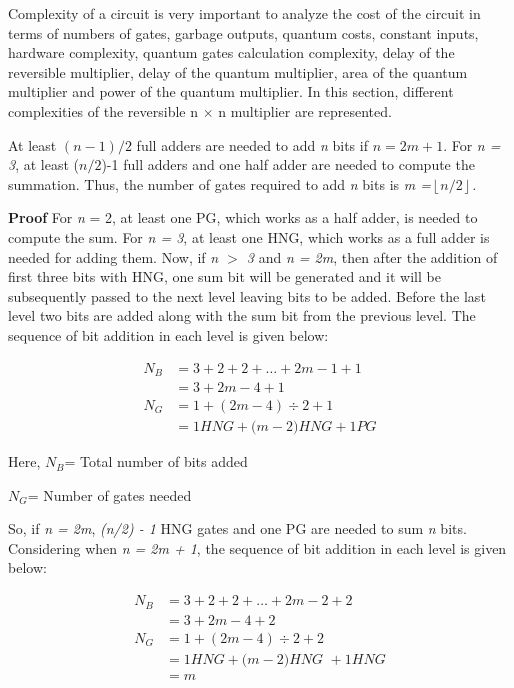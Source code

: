 Complexity of a circuit is very important to analyze the cost of the circuit in terms of numbers of gates, garbage outputs, quantum costs, constant inputs, hardware complexity, quantum gates calculation complexity, delay of the reversible multiplier, delay of the quantum multiplier, area of the quantum multiplier and power of the quantum multiplier. In this section, different complexities of the reversible {n $\times$ n} multiplier are represented.
\begin{property}\label{p1_c3_p1}\textnormal{
	At least $(n-1)/2$ full adders are needed to add \textit{n} bits if $n=2m+1$. For \textit{n = 3}, at least ($n/2$)-1 full adders and one half adder are needed to compute the summation. Thus, the number of gates required to add \textit{n }bits is \textit{m =$\left\lfloor n/2\right\rfloor $.}}
\end{property}
\noindent\textbf{Proof}
	For \textit{n} = 2, at least one PG, which works as a half adder, is needed to compute the sum. For \textit{n = 3}, at least one HNG, which works as a full adder is needed for adding them. Now, if  \textit{n $>$ 3} and \textit{n = 2m}, then after the addition of first three bits with HNG, one sum bit will be generated and it will be subsequently passed to the next level leaving  bits to be added. Before the last level two bits are added along with the sum bit from the previous level. The sequence of bit addition in each level is given below:


\begin{align*}
N_{B} &= 3+2+2+{\dots}+2m-1+1\\
&= 3+2m-4+1\\ 
N_{G} &= 1+(2m-4)\div 2+1\\ 
&= 1 {HNG }+ {(}m-2{) HNG }+ 1{ PG}
\end{align*}


	
\noindent Here, $N_{B} $= Total number of bits added
	
\noindent $N_{G} $= Number of gates needed
	
\noindent So, if \textit{n = 2m}, \textit{(n/2) - 1} HNG gates and one PG are needed to sum \textit{n} bits. Considering when \textit{n = 2m + 1}, the sequence of bit addition in each level is given below:

\begin{align*}
N_{B} &= 3+2+2+{\dots}+2m-2+2\\
&= 3+2m-4+2\\
N_{G} &= 1+(2m-4)\div 2+ 2\\ 
&= 1 {HNG} + {(}m-2\textit{)HNG }+ 1{ HNG}\\
&= m
\end{align*}



